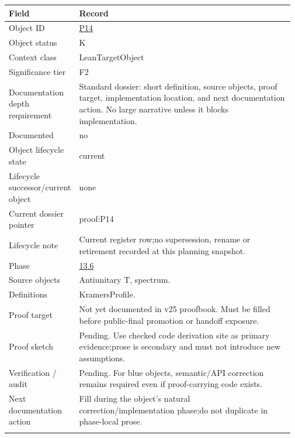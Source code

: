 \begin{longtable}{L{0.16\linewidth} L{0.81\linewidth}}
\hline
\textbf{Field} & \textbf{Record}\\
\hline
Object ID & \hyperlink{object-row-P14}{P14}\\
\hline\addlinespace[0.20em]
Object status & K\\
\hline\addlinespace[0.20em]
Context class & LeanTargetObject\\
\hline\addlinespace[0.20em]
Significance tier & F2\\
\hline\addlinespace[0.20em]
Documentation depth requirement & Standard dossier: short definition, source objects, proof target, implementation location, and next documentation action. No large narrative unless it blocks implementation.\\
\hline\addlinespace[0.20em]
Documented & no\\
\hline\addlinespace[0.20em]
Object lifecycle state & current\\
\hline\addlinespace[0.20em]
Lifecycle successor/\allowbreak{}current object & none\\
\hline\addlinespace[0.20em]
Current dossier pointer & proof:P14\\
\hline\addlinespace[0.20em]
Lifecycle note & Current register row;\newline no supersession, rename or retirement recorded at this planning snapshot.\\
\hline\addlinespace[0.20em]
Phase & \hyperlink{phase-row-13-6}{13.6}\\
\hline\addlinespace[0.20em]
Source objects & Antiunitary T, spectrum.\\
\hline\addlinespace[0.20em]
Definitions & KramersProfile.\\
\hline\addlinespace[0.20em]
Proof target & Not yet documented in v25 proofbook. Must be filled before public-final promotion or handoff exposure.\\
\hline\addlinespace[0.20em]
Proof sketch & Pending. Use checked code derivation site as primary evidence;\newline prose is secondary and must not introduce new assumptions.\\
\hline\addlinespace[0.20em]
Verification /\allowbreak{} audit & Pending. For blue objects, semantic/\allowbreak{}API correction remains required even if proof-carrying code exists.\\
\hline\addlinespace[0.20em]
Next documentation action & Fill during the object's natural correction/\allowbreak{}implementation phase;\newline do not duplicate in phase-local prose.\\
\hline\addlinespace[0.20em]
\end{longtable}
